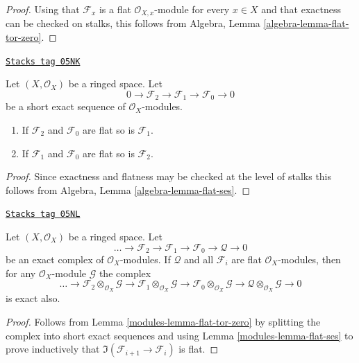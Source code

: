 \begin{proof}
Using that $\mathcal{F}_x$ is a flat $\mathcal{O}_{X, x}$-module
for every $x \in X$ and that exactness can be checked on stalks, this
follows from
Algebra, Lemma \ref{algebra-lemma-flat-tor-zero}.
\end{proof}

\begin{lemma}
\label{modules-lemma-flat-ses}
\href{https://stacks.math.columbia.edu/tag/05NK}{\texttt{Stacks tag 05NK}}


Let $(X, \mathcal{O}_X)$ be a ringed space.
Let
$$
0 \to
\mathcal{F}_2 \to
\mathcal{F}_1 \to
\mathcal{F}_0 \to 0
$$
be a short exact sequence of $\mathcal{O}_X$-modules.
\begin{enumerate}
\item If $\mathcal{F}_2$ and $\mathcal{F}_0$ are flat so is
$\mathcal{F}_1$.
\item If $\mathcal{F}_1$ and $\mathcal{F}_0$ are flat so is
$\mathcal{F}_2$.
\end{enumerate}
\end{lemma}

\begin{proof}
Since exactness and flatness may be checked at the level of stalks
this follows from
Algebra, Lemma \ref{algebra-lemma-flat-ses}.
\end{proof}

\begin{lemma}
\label{modules-lemma-flat-resolution-of-flat}
\href{https://stacks.math.columbia.edu/tag/05NL}{\texttt{Stacks tag 05NL}}

Let $(X, \mathcal{O}_X)$ be a ringed space.
Let
$$
\ldots \to
\mathcal{F}_2 \to
\mathcal{F}_1 \to
\mathcal{F}_0 \to
\mathcal{Q} \to 0
$$
be an exact complex of $\mathcal{O}_X$-modules.
If $\mathcal{Q}$ and all $\mathcal{F}_i$ are flat $\mathcal{O}_X$-modules,
then for any $\mathcal{O}_X$-module $\mathcal{G}$ the complex
$$
\ldots \to
\mathcal{F}_2 \otimes_{\mathcal{O}_X} \mathcal{G} \to
\mathcal{F}_1 \otimes_{\mathcal{O}_X} \mathcal{G} \to
\mathcal{F}_0 \otimes_{\mathcal{O}_X} \mathcal{G} \to
\mathcal{Q} \otimes_{\mathcal{O}_X} \mathcal{G} \to 0
$$
is exact also.
\end{lemma}

\begin{proof}

Follows from Lemma \ref{modules-lemma-flat-tor-zero} by splitting the complex
into short exact sequences and using Lemma \ref{modules-lemma-flat-ses} to
prove inductively that $\Im(\mathcal{F}_{i + 1} \to \mathcal{F}_i)$
is flat.
\end{proof}

